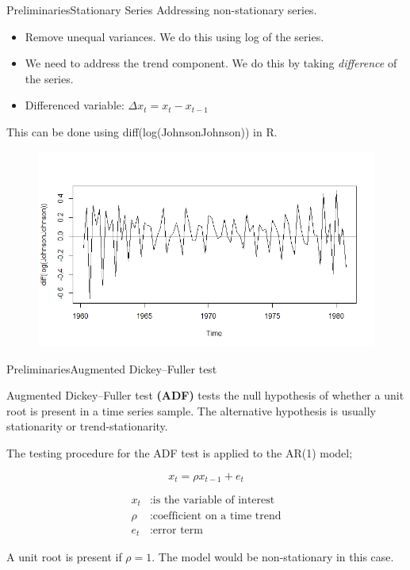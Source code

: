 \documentclass{beamer}
\begin{document}
\begin{frame}{Preliminaries}{Stationary Series}
Addressing non-stationary series. \pause
\begin{itemize}
\item Remove unequal variances. We do this using log of the series. 
\item We need to address the trend component. We do this by taking \textit{difference} of the series.
\item Differenced variable: $ \Delta x_t = x_t - x_{t-1}$
\end{itemize} 

This can be done using diff(log(JohnsonJohnson)) in R. 

\begin{figure}
\centering
\includegraphics[width=0.6\linewidth]{difflog}
\end{figure}

\end{frame}


\begin{frame}{Preliminaries}{Augmented Dickey–Fuller test}
	\small{
Augmented Dickey–Fuller test \textbf{(ADF)} tests the null hypothesis of whether a unit root is present in a time series sample. The alternative hypothesis is usually stationarity or trend-stationarity. 

The testing procedure for the ADF test is applied to the AR(1) model;

\begin{equation}
x_t = \rho x_{t-1} + e_t
\end{equation}
}
\begin{align*}
x_t &: \text{is the variable of interest}\\
\rho &: \text{coefficient on a time trend} \\
e_t &: \text{error term}
\end{align*}


\small{A unit root is present if $ \rho=1 $. The model would be non-stationary in this case.}

\end{frame}
\end{document}
